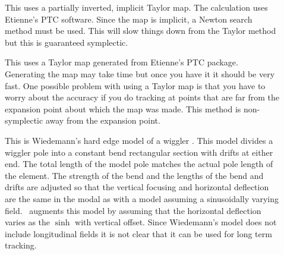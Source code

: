 \begin{description}
\item[]
This uses a partially inverted, implicit Taylor map. The calculation
uses Etienne's PTC software.  Since the map is implicit, a Newton
search method must be used. This will slow things down from the Taylor
method but this is guaranteed symplectic.

\item[]
This uses a Taylor map generated from Etienne's PTC
package. Generating the map may take time but once you have it it
should be very fast. One possible problem with using a Taylor map is
that you have to worry about the accuracy if you do tracking at points
that are far from the expansion point about which the map was
made. This method is non-symplectic away from the expansion point. 

\item[]
This is Wiedemann's hard edge model of a wiggler
\cite{wiedemann}. This model divides a wiggler pole into a constant 
bend rectangular section with drifts at either end. The total length
of the model pole matches the actual pole length of the element. The
strength of the bend and the lengths of the bend and drifts are
adjusted so that the vertical focusing and horizontal deflection are
the same in the modal as with a model assuming a sinusoidally varying
field. \bmad\ augments this model by assuming that the horizontal
deflection varies as the $\sinh$ with vertical offset.  Since
Wiedemann's model does not include longitudinal fields it is not clear
that it can be used for long term tracking.

\end{description}

\vfill \break

